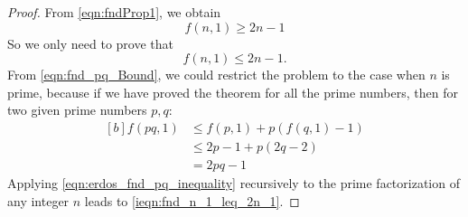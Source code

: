 \documentclass[12pt]{article}
\theoremstyle{definition}
\numberwithin{equation}{theorem}
\numberwithin{figure}{theorem}
\newcommand{\fnd}[2]{\ensuremath{f(#1,#2)}}
\begin{document}
    \begin{proof}
        From \eqref{eqn:fndProp1}, we obtain 
        \begin{equation}\label{ieqn:fnd_n_1_get_2n_1}
            \fnd{n}{1} \geq 2 n - 1
        \end{equation}            
        So we only need to prove that 
        \begin{equation}\label{ieqn:fnd_n_1_leq_2n_1}
            \fnd{n}{1} \leq 2n - 1.
        \end{equation}            
        From \eqref{eqn:fnd_pq_Bound}, we could restrict the problem to the case when $n$ is prime, 
        because if we have proved the theorem for all 
        the prime numbers,
        then for two given prime numbers $p,q$:
        \begin{equation}\label{eqn:erdos_fnd_pq_inequality}
        \begin{aligned}[b]
            \fnd{pq}{1} &\leq \fnd{p}{1} + p (\fnd{q}{1} - 1) \\
            &\leq 2 p - 1 + p (2 q - 2) \\
            &= 2pq - 1         
        \end{aligned}
        \end{equation}
        Applying \eqref{eqn:erdos_fnd_pq_inequality} recursively 
        to the prime factorization of any integer 
        $n$ leads to \eqref{ieqn:fnd_n_1_leq_2n_1}.
    

\end{proof}
\end{document}
